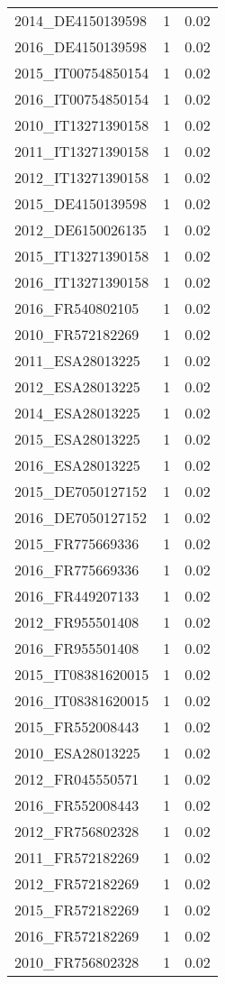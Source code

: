 \begin{table*}[htbp]
\begin{tabular}{lrr}
2014_DE4150139598 & 1 & 0.02 \\
2016_DE4150139598 & 1 & 0.02 \\
2015_IT00754850154 & 1 & 0.02 \\
2016_IT00754850154 & 1 & 0.02 \\
2010_IT13271390158 & 1 & 0.02 \\
2011_IT13271390158 & 1 & 0.02 \\
2012_IT13271390158 & 1 & 0.02 \\
2015_DE4150139598 & 1 & 0.02 \\
2012_DE6150026135 & 1 & 0.02 \\
2015_IT13271390158 & 1 & 0.02 \\
2016_IT13271390158 & 1 & 0.02 \\
2016_FR540802105 & 1 & 0.02 \\
2010_FR572182269 & 1 & 0.02 \\
2011_ESA28013225 & 1 & 0.02 \\
2012_ESA28013225 & 1 & 0.02 \\
2014_ESA28013225 & 1 & 0.02 \\
2015_ESA28013225 & 1 & 0.02 \\
2016_ESA28013225 & 1 & 0.02 \\
2015_DE7050127152 & 1 & 0.02 \\
2016_DE7050127152 & 1 & 0.02 \\
2015_FR775669336 & 1 & 0.02 \\
2016_FR775669336 & 1 & 0.02 \\
2016_FR449207133 & 1 & 0.02 \\
2012_FR955501408 & 1 & 0.02 \\
2016_FR955501408 & 1 & 0.02 \\
2015_IT08381620015 & 1 & 0.02 \\
2016_IT08381620015 & 1 & 0.02 \\
2015_FR552008443 & 1 & 0.02 \\
2010_ESA28013225 & 1 & 0.02 \\
2012_FR045550571 & 1 & 0.02 \\
2016_FR552008443 & 1 & 0.02 \\
2012_FR756802328 & 1 & 0.02 \\
2011_FR572182269 & 1 & 0.02 \\
2012_FR572182269 & 1 & 0.02 \\
2015_FR572182269 & 1 & 0.02 \\
2016_FR572182269 & 1 & 0.02 \\
2010_FR756802328 & 1 & 0.02 \\

\end{tabular}
\end{table*}
